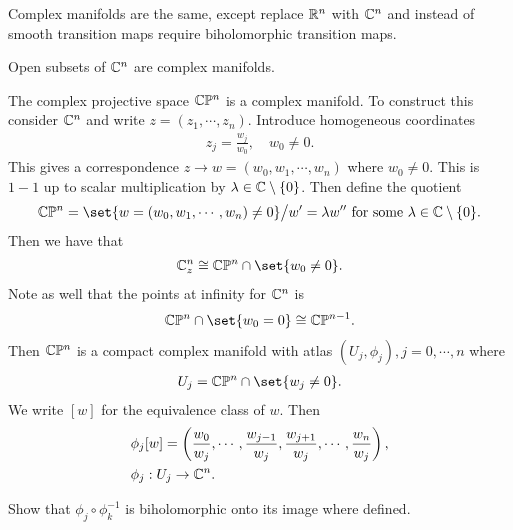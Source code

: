 \begin{definition}
    Complex manifolds are the same, except replace $\mathbb{R}^n$ with $\mathbb{C}^n$ and instead of smooth transition maps require biholomorphic transition maps.
\end{definition}

\begin{example}
    Open subsets of $\mathbb{C}^n$ are complex manifolds.
\end{example}
\begin{example}
    The complex projective space $\mathbb{C} \mathbb{P}^n$ is a complex manifold. To construct this consider $\mathbb{C}^n$ and write $z = (z_1, \cdots, z_n)$. Introduce homogeneous coordinates
    \begin{align*}
        z_j = \frac{w_j}{w_0}, \quad w_0 \neq 0.
    \end{align*}
    This gives a correspondence $z \to w = (w_0 , w_1, \cdots, w_n)$ where $w_0 \neq 0$. This is $1-1$ up to scalar multiplication by $\lambda \in \mathbb{C} \setminus \{ 0 \}$. Then define the quotient
    \begin{align*}
        \C\PP^n =  \set{ w = (w_0 , w_1 , \cdots, w_n ) \neq 0  }  \big/ w' = \lambda w'' \text{ for some } \lambda \in \C \setminus \{ 0 \}.
    \end{align*}
    Then we have that
    \begin{align*}
        \C^n_z \cong \C \PP^n \cap \set{ w_0 \neq 0}.
    \end{align*}
    Note as well that the points at infinity for $\mathbb{C}^n$ is
    \begin{align*}
        \C \PP^n \cap \set{w_0 = 0} \cong \C \PP^{n-1}.
    \end{align*}
    Then $\mathbb{C} \mathbb{P}^n$ is a compact complex manifold with atlas $(U_j, \phi_j) , j = 0 ,\cdots, n$ where 
    \begin{align*}
        U_j = \C \PP^n \cap \set{w_j \neq 0}.
    \end{align*}
    We write $[w] $ for the equivalence class of $w$. Then
    \begin{align*}
        &\phi_j [w] = \left(  \frac{w_0}{w_j} , \cdots, \frac{w_{j-1}}{w_j}, \frac{w_{j+1}}{w_j}, \cdots, \frac{w_n}{w_j}  \right),\\
        &\phi_j : U_j \to \mathbb{C}^n.
    \end{align*}
\end{example}
\begin{exercise}
    Show that $\phi_j \circ \phi^{-1}_k$ is biholomorphic onto its image where defined.
\end{exercise}

